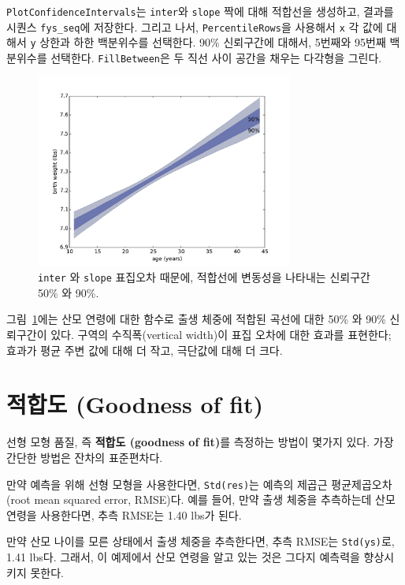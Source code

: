 {\tt PlotConfidenceIntervals}는 {\tt inter}와 {\tt slope} 짝에 대해 적합선을 생성하고, 결과를 시퀀스 \verb"fys_seq"에 저장한다.
그리고 나서, {\tt PercentileRows}을 사용해서 {\tt x} 각 값에 대해서 {\tt y} 상한과 하한 백분위수를 선택한다. 
90\% 신뢰구간에 대해서, 5번째와 95번째 백분위수를 선택한다. 
{\tt FillBetween}은 두 직선 사이 공간을 채우는 다각형을 그린다.

\begin{figure}
\centerline{\includegraphics[height=2.5in]{figs/linear3.pdf}}
\caption{{\tt inter} 와 {\tt slope} 표집오차 때문에,
적합선에 변동성을 나타내는 신뢰구간 50\% 와 90\%.}
\label{linear3}
\end{figure}

그림~\ref{linear3}에는 산모 연령에 대한 함수로 출생 체중에 적합된 곡선에 대한 50\% 와 90\% 신뢰구간이 있다. 구역의 수직폭(vertical width)이 표집 오차에 대한 효과를 표현한다; 효과가 평균 주변 값에 대해 더 작고, 극단값에 대해 더 크다.

\section{적합도 (Goodness of fit)}
\label{goodness}

선형 모형 품질, 즉 {\bf 적합도 (goodness of fit)}를 측정하는 방법이 몇가지 있다. 가장 간단한 방법은 잔차의 표준편차다.


만약 예측을 위해 선형 모형을 사용한다면, {\tt Std(res)}는 예측의 제곱근 평균제곱오차(root mean squared error, RMSE)다.
예를 들어, 만약 출생 체중을 추측하는데 산모 연령을 사용한다면, 추측 RMSE는 1.40 lbs가 된다.

만약 산모 나이를 모른 상태에서 출생 체중을 추측한다면, 
추측 RMSE는 {\tt Std(ys)}로, 1.41 lbs다.  
그래서, 이 예제에서 산모 연령을 알고 있는 것은 그다지 예측력을 향상시키지 못한다.

